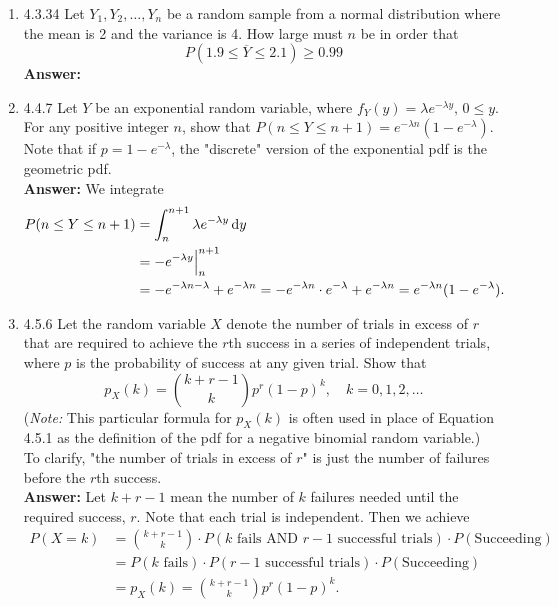 \documentclass{article}
\begin{document}
\begin{enumerate}
        \item 4.3.34 Let $Y_1,Y_2, \ldots, Y_n$ be a random sample from a normal distribution where the mean is 2 and the variance is 4. How large must $n$ be in order that
            \[P(1.9 \leq \overline{Y} \leq 2.1) \geq 0.99\]
        \textbf{Answer: }\\
        
        \item 4.4.7 Let $Y$ be an exponential random variable, where $f_Y(y) = \lambda e^{-\lambda y}, \, 0 \leq y$. For any positive integer $n$, show that $P(n \leq Y \leq n+1) = e^{-\lambda n}(1-e^{-\lambda})$. Note that if $p = 1-e^{-\lambda}$, the "discrete" version of the exponential pdf is the geometric pdf.\\
        \textbf{Answer: }We integrate
            \begin{align*}
                P(n \leq Y \leq n+1) &= \int_n^{n+1} \lambda e^{-\lambda y} \dif y\\
                &= -e^{-\lambda y}\Big|_n^{n+1}\\
                &= -e^{-\lambda n-\lambda} + e^{-\lambda n} = -e^{-\lambda n} \cdot e^{-\lambda} + e^{-\lambda n} = e^{-\lambda n}(1-e^{-\lambda}).
            \end{align*}
        
        \item 4.5.6 Let the random variable $X$ denote the number of trials in excess of $r$ that are required to achieve the $r$th success in a series of independent trials, where $p$ is the probability of success at any given trial. Show that
            \[p_X(k) = {k+r-1 \choose k} p^r(1-p)^k, \quad k=0,1,2,\ldots\]
        (\textit{Note:} This particular formula for $p_X(k)$ is often used in place of Equation 4.5.1 as the definition of the pdf for a negative binomial random variable.)\\
        To clarify, "the number of trials in excess of $r$" is just the number of failures before the $r$th success.\\
        \textbf{Answer: }Let $k+r-1$ mean the number of $k$ failures needed until the required success, $r$. Note that each trial is independent. Then we achieve 
            \begin{align*}
                P(X=k) &= {k+r-1 \choose k} \cdot P(\text{$k$ fails AND $r-1$ successful trials}) \cdot P(\text{Succeeding})\\
                &= P(\text{$k$ fails})\cdot P(\text{$r-1$ successful trials}) \cdot P(\text{Succeeding})\\
                &= p_X(k) = {k+r-1 \choose k} p^r(1-p)^k.
            \end{align*}
        

\end{enumerate}
\end{document}
